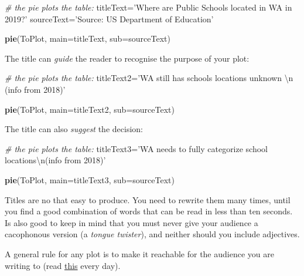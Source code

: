 \documentclass[]{article}
\newenvironment{Shaded}{\begin{snugshade}}{\end{snugshade}}
\newcommand{\KeywordTok}[1]{\textcolor[rgb]{0.13,0.29,0.53}{\textbf{#1}}}
\newcommand{\DataTypeTok}[1]{\textcolor[rgb]{0.13,0.29,0.53}{#1}}
\newcommand{\CharTok}[1]{\textcolor[rgb]{0.31,0.60,0.02}{#1}}
\newcommand{\StringTok}[1]{\textcolor[rgb]{0.31,0.60,0.02}{#1}}
\newcommand{\CommentTok}[1]{\textcolor[rgb]{0.56,0.35,0.01}{\textit{#1}}}
\newcommand{\NormalTok}[1]{#1}
\begin{document}
\begin{Shaded}
\begin{Highlighting}[]
\CommentTok{# the pie plots the table:}
\NormalTok{titleText=}\StringTok{'Where are Public Schools located in WA in 2019?'}
\NormalTok{sourceText=}\StringTok{'Source: US Department of Education'}

\KeywordTok{pie}\NormalTok{(ToPlot,}
    \DataTypeTok{main=}\NormalTok{titleText,}
    \DataTypeTok{sub=}\NormalTok{sourceText)}
\end{Highlighting}
\end{Shaded}

The title can \emph{guide} the reader to recognise the purpose of your
plot:

\begin{Shaded}
\begin{Highlighting}[]
\CommentTok{# the pie plots the table:}
\NormalTok{titleText2=}\StringTok{'WA still has schools locations unknown }\CharTok{\textbackslash{}n}\StringTok{ (info from 2018)'}

\KeywordTok{pie}\NormalTok{(ToPlot,}
    \DataTypeTok{main=}\NormalTok{titleText2,}
    \DataTypeTok{sub=}\NormalTok{sourceText)}
\end{Highlighting}
\end{Shaded}

The title can also \emph{suggest} the decision:

\begin{Shaded}
\begin{Highlighting}[]
\CommentTok{# the pie plots the table:}
\NormalTok{titleText3=}\StringTok{'WA needs to fully categorize school locations}\CharTok{\textbackslash{}n}\StringTok{(info from 2018)'}

\KeywordTok{pie}\NormalTok{(ToPlot,}
    \DataTypeTok{main=}\NormalTok{titleText3,}
    \DataTypeTok{sub=}\NormalTok{sourceText)}
\end{Highlighting}
\end{Shaded}

Titles are no that easy to produce. You need to rewrite them many times,
until you find a good combination of words that can be read in less than
ten seconds. Is also good to keep in mind that you must never give your
audience a cacophonous version (a \emph{tongue twister}), and neither
should you include adjectives.

A general rule for any plot is to make it reachable for the audience you
are writing to (read
\href{https://www.red-gate.com/simple-talk/sysadmin/general/5-steps-to-making-your-boss-read-your-technical-reports/}{this}
every day).
\end{document}
